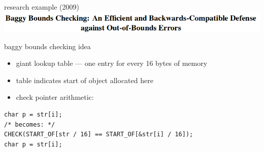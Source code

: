 
\begin{frame}{research example (2009)}
    \includegraphics[width=\textwidth]{../bounds/baggy-bounds-title}
\end{frame}

\begin{frame}[fragile,label=lookupTable]{baggy bounds checking idea}
    \begin{itemize}
        \item giant lookup table --- one entry for every 16 bytes of memory
        \item table indicates start of object allocated here
        \item check pointer arithmetic:
    \end{itemize}
\begin{lstlisting}
char p = str[i];
/* becomes: */
CHECK(START_OF[str / 16] == START_OF[&str[i] / 16]);
char p = str[i];
\end{lstlisting}
\end{frame}


